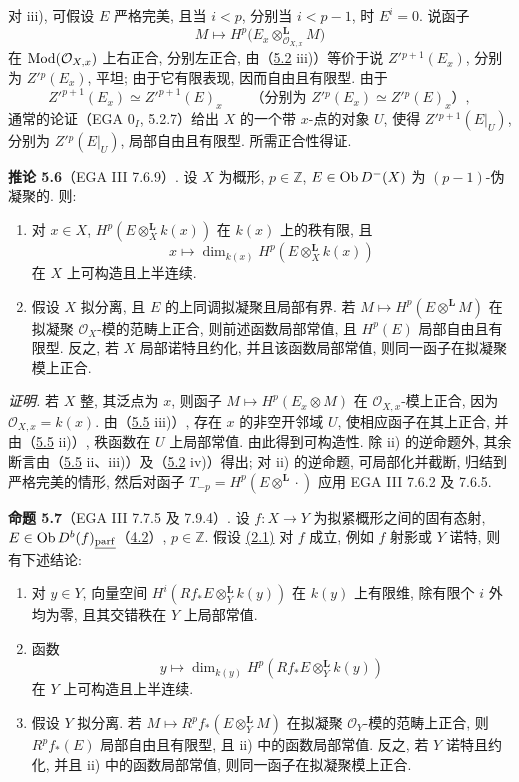 对 iii), 可假设 \(E\) 严格完美, 且当 \(i<p\), 分别当 \(i<p-1\), 时 \(E^i=0\). 说函子
\[
 M\longmapsto H^p\bigl(E_x\otimes_{\mathcal O_{X,x}}^{\mathbf L}M\bigr)
\]
在 \(\operatorname{Mod}(\mathcal O_{X,x})\) 上右正合, 分别左正合, 由（\hyperlink{sga6.e03.rem.5-2}{5.2} iii)）等价于说 \(Z'{}^{p+1}(E_x)\), 分别为 \(Z'{}^p(E_x)\), 平坦; 由于它有限表现, 因而自由且有限型. 由于
\[
 Z'^{p+1}(E_x)\simeq Z'^{p+1}(E)_x
 \qquad\text{（分别为 }Z'{}^p(E_x)\simeq Z'{}^p(E)_x\text{）},
\]
通常的论证（EGA \(0_I\), 5.2.7）给出 \(X\) 的一个带 \(x\)-点的对象 \(U\), 使得 \(Z'{}^{p+1}(E|_U)\), 分别为 \(Z'{}^p(E|_U)\), 局部自由且有限型. 所需正合性得证.

\textbf{推论 5.6}（EGA III 7.6.9）. 设 \(X\) 为概形, \(p\in\mathbb Z\), \(E\in\operatorname{Ob} D^{-}(X)\) 为 \((p-1)\)-伪凝聚的. 则:
\begin{enumerate}[label=\roman*)]
\item 对 \(x\in X\), \(H^p(E\otimes_X^{\mathbf L}k(x))\) 在 \(k(x)\) 上的秩有限, 且
\[
 x\longmapsto \dim_{k(x)}H^p(E\otimes_X^{\mathbf L}k(x))
\]
在 \(X\) 上可构造且上半连续.
\item 假设 \(X\) 拟分离, 且 \(E\) 的上同调拟凝聚且局部有界. 若 \(M\mapsto H^p(E\otimes^{\mathbf L}M)\) 在拟凝聚 \(\mathcal O_X\)-模的范畴上正合, 则前述函数局部常值, 且 \(H^p(E)\) 局部自由且有限型. 反之, 若 \(X\) 局部诺特且约化, 并且该函数局部常值, 则同一函子在拟凝聚模上正合.
\end{enumerate}

\emph{证明.} 若 \(X\) 整, 其泛点为 \(x\), 则函子 \(M\mapsto H^p(E_x\otimes M)\) 在 \(\mathcal O_{X,x}\)-模上正合, 因为 \(\mathcal O_{X,x}=k(x)\). 由（\hyperlink{sga6.e03.lem.5-5}{5.5} iii)）, 存在 \(x\) 的非空开邻域 \(U\), 使相应函子在其上正合, 并由（\hyperlink{sga6.e03.lem.5-5}{5.5} ii)）, 秩函数在 \(U\) 上局部常值. 由此得到可构造性. 除 ii) 的逆命题外, 其余断言由（\hyperlink{sga6.e03.lem.5-5}{5.5} ii、iii)）及（\hyperlink{sga6.e03.rem.5-2}{5.2} iv)）得出; 对 ii) 的逆命题, 可局部化并截断, 归结到严格完美的情形, 然后对函子 \(T_{-p}=H^p(E\otimes^{\mathbf L}\cdot)\) 应用 EGA III 7.6.2 及 7.6.5.

\textbf{命题 5.7}（EGA III 7.7.5 及 7.9.4）. 设 \(f:X\to Y\) 为拟紧概形之间的固有态射, \(E\in\operatorname{Ob} D^b(f)_{\underline{\mathrm{parf}}}\)（\hyperlink{sga6.e03.notation.4-2}{4.2}）, \(p\in\mathbb Z\). 假设 \hyperlink{sga6.e03.conj.2-1}{(2.1)} 对 \(f\) 成立, 例如 \(f\) 射影或 \(Y\) 诺特, 则有下述结论:
\begin{enumerate}[label=\roman*)]
\item 对 \(y\in Y\), 向量空间 \(H^i(Rf_*E\otimes_Y^{\mathbf L}k(y))\) 在 \(k(y)\) 上有限维, 除有限个 \(i\) 外均为零, 且其交错秩在 \(Y\) 上局部常值.
\item 函数
\[
 y\longmapsto \dim_{k(y)}H^p(Rf_*E\otimes_Y^{\mathbf L}k(y))
\]
在 \(Y\) 上可构造且上半连续.
\item 假设 \(Y\) 拟分离. 若 \(M\mapsto R^pf_*(E\otimes_Y^{\mathbf L}M)\) 在拟凝聚 \(\mathcal O_Y\)-模的范畴上正合, 则 \(R^pf_*(E)\) 局部自由且有限型, 且 ii) 中的函数局部常值. 反之, 若 \(Y\) 诺特且约化, 并且 ii) 中的函数局部常值, 则同一函子在拟凝聚模上正合.
\end{enumerate}

